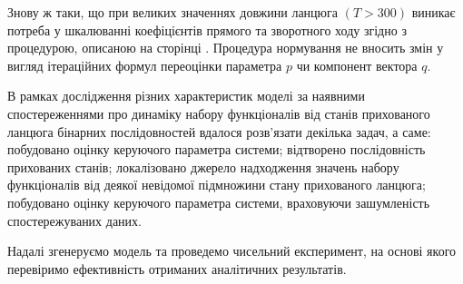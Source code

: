 Знову ж таки, що при великих значеннях довжини ланцюга $(T>300)$ виникає потреба у шкалюванні коефіцієнтів прямого та зворотного ходу згідно з процедурою, описаною на сторінці \pageref{eq: alpha, forward algorithm coefficients}. Процедура нормування не вносить змін у вигляд ітераційних формул переоцінки параметра $p$ чи компонент вектора $q$.

\chapconclude{\ref{chap: theory}}

В рамках дослідження різних характеристик моделі за наявними спостереженнями про динаміку набору функціоналів від станів прихованого ланцюга бінарних послідовностей вдалося розв'язати декілька задач, а саме: побудовано оцінку керуючого параметра системи; відтворено послідовність прихованих станів; локалізовано джерело надходження значень набору функціоналів від деякої невідомої підмножини стану прихованого ланцюга; побудовано оцінку керуючого параметра системи, враховуючи зашумленість спостережуваних даних.

Надалі згенеруємо модель та проведемо чисельний експеримент, на основі якого перевіримо ефективність отриманих аналітичних результатів.